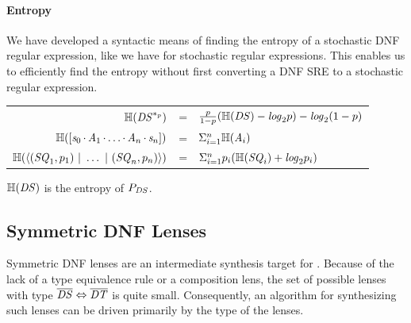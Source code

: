 \documentclass[acmsmall,screen,anonymous]{acmart}
\begin{document}
\paragraph*{Entropy}
We have developed a syntactic means of finding the entropy of a stochastic DNF
regular expression, like we have for stochastic regular expressions. This
enables us to efficiently find the entropy without first converting a DNF SRE to
a stochastic regular expression.

\begin{center}
  \begin{tabular}{rcl}
    $\mathbb{H}(\mathit{DS}^{*_{p}})$
    & =
    & $\frac{p}{1-p}(\mathbb{H}(\mathit{DS}) - \mathit{log}_2p)
      - \mathit{log}_2(1-p)
      $\\
    
    $\mathbb{H}([\mathit{s}_0 \mkern-1mu\cdot\mkern-1mu \mathit{A}_1 \mkern-1mu\cdot\mkern-1mu \ldots \mkern-1mu\cdot\mkern-1mu \mathit{A}_n \mkern-1mu\cdot\mkern-1mu \mathit{s}_n])$
    & =
    & $\Sigma_{i = 1}^n\mathbb{H}(\mathit{A}_i)$ \\
    
    $\mathbb{H}(\langle(\mathit{SQ}_1,p_1) ~|~ \ldots ~|~ (\mathit{SQ}_n,p_n)\rangle)$
    & =
    & $\Sigma_{i=1}^np_i(\mathbb{H}(\mathit{SQ}_i)+\mathit{log}_2p_i)$\\
  \end{tabular}
\end{center}

\begin{theorem}
  $\mathbb{H}(\mathit{DS})$ is the entropy of $P_{\mathit{DS}}$.
\end{theorem}

\subsection{Symmetric DNF Lenses}
Symmetric DNF lenses are an intermediate synthesis target for \GreedySynth.
Because of the lack of a type equivalence rule or a composition lens, the set of
possible lenses with type $\overline{\mathit{DS}} \Leftrightarrow
\overline{\mathit{DT}}$ is quite small. Consequently, an algorithm for
synthesizing such lenses can be driven primarily by the type of the lenses.
\end{document}
